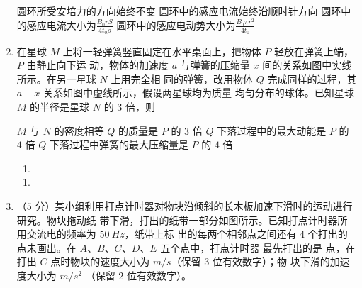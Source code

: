 \begin{enumerate}
\fourchoices
{圆环所受安培力的方向始终不变}
{圆环中的感应电流始终沿顺时针方向}
{圆环中的感应电流大小为$\frac{B_{0} r S}{4 t_{0} \rho}$}
{圆环中的感应电动势大小为$\frac{B_{0} \pi r^{2}}{4 t_{0}}$}

\banswer{

}

\newpage
\item
在星球 $ M $ 上将一轻弹簧竖直固定在水平桌面上，把物体 $ P $ 轻放在弹簧上端， $ P $ 由静止向下运
动，物体的加速度 $ a $ 与弹簧的压缩量 $ x $ 间的关系如图中实线所示。在另一星球 $ N $ 上用完全相
同的弹簧，改用物体 $ Q $ 完成同样的过程，其 $ a-x $ 关系如图中虚线所示，假设两星球均为质量
均匀分布的球体。已知星球 $ M $ 的半径是星球 $ N $ 的 $ 3 $ 倍，则  

\begin{figure}[h!]
\centering

\end{figure}

\fourchoices
{$ M $ 与 $ N $ 的密度相等}
{$ Q $ 的质量是 $ P $ 的 $ 3 $ 倍}
{$ Q $ 下落过程中的最大动能是 $ P $ 的 $ 4 $ 倍}
{$ Q $ 下落过程中弹簧的最大压缩量是 $ P $ 的 $ 4 $ 倍}


\begin{enumerate}[leftmargin=-2em]
\renewcommand{\labelenumii}{}
\item
{}
\end{enumerate}

\begin{enumerate}[leftmargin=-2em]
\renewcommand{\labelenumii}{}
\item
{}
\end{enumerate}

\item
（$ 5 $ 分）某小组利用打点计时器对物块沿倾斜的长木板加速下滑时的运动进行研究。物块拖动纸
带下滑，打出的纸带一部分如图所示。已知打点计时器所用交流电的频率为 $ 50 \ Hz $，纸带上标
出的每两个相邻点之间还有 $ 4 $ 个打出的点未画出。在 $ A $、$ B $、$ C $、$ D $、$ E $ 五个点中，打点计时器
最先打出的是
点，在打出 $ C $ 点时物块的速度大小为
$ m/s $（保留 $ 3 $ 位有效数字）；物
块下滑的加速度大小为
$ m/s^{2} $ （保留 $ 2 $ 位有效数字）。
\begin{figure}[h!]
\centering

\end{figure}




\end{enumerate}
